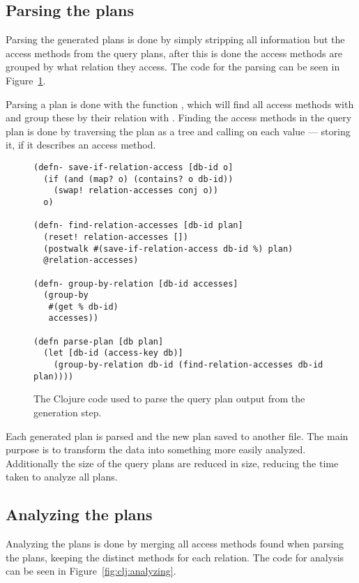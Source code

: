 \subsection{Parsing the plans}\label{sec:parsing}
Parsing the generated plans is done by simply stripping all information but the
access methods from the query plans, after this is done the access methods are
grouped by what relation they access. The code for the parsing can be seen in
Figure~\ref{fig:clj:parsing}.

Parsing a plan is done with the function , which will find all
access methods with  and group these by their relation
with . Finding the access methods in the query plan is
done by traversing the plan as a tree and calling 
on each value --- storing it, if it describes an access method.

\begin{figure}[ht]
\begin{verbatim}
(defn- save-if-relation-access [db-id o]
  (if (and (map? o) (contains? o db-id))
    (swap! relation-accesses conj o))
  o)

(defn- find-relation-accesses [db-id plan]
  (reset! relation-accesses [])
  (postwalk #(save-if-relation-access db-id %) plan)
  @relation-accesses)

(defn- group-by-relation [db-id accesses]
  (group-by
   #(get % db-id)
   accesses))

(defn parse-plan [db plan]
  (let [db-id (access-key db)]
    (group-by-relation db-id (find-relation-accesses db-id plan))))
   \end{verbatim}
   \caption[The Clojure code to parse a query]{The Clojure code used to parse
     the query plan output from the generation step.}
\label{fig:clj:parsing}
\end{figure}

Each generated plan is parsed and the new plan saved to another file. The main
purpose is to transform the data into something more easily analyzed.
Additionally the size of the query plans are reduced in size, reducing the
time taken to analyze all plans.

\subsection{Analyzing the plans}\label{sec:analyzingplans}
Analyzing the plans is done by merging all access methods found when parsing the
plans, keeping the distinct methods for each relation. The code for analysis can
be seen in Figure~\ref{fig:clj:analyzing}.

